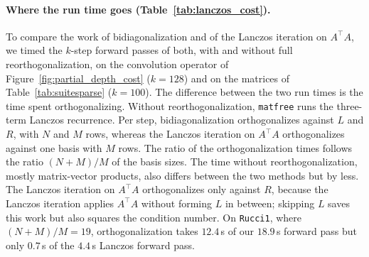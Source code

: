 \documentclass[a4paper,12pt]{article}
\theoremstyle{definition}
\begin{document}
\paragraph{Where the run time goes (Table~\ref{tab:lanczos_cost}).}
To compare the work of bidiagonalization and of the Lanczos iteration on $A^\top A$, we timed the $k$-step forward passes of both, with and without full reorthogonalization, on the convolution operator of Figure~\ref{fig:partial_depth_cost} ($k = 128$) and on the matrices of Table~\ref{tab:suitesparse} ($k = 100$). The difference between the two run times is the time spent orthogonalizing. Without reorthogonalization, \texttt{matfree} runs the three-term Lanczos recurrence. Per step, bidiagonalization orthogonalizes against $L$ and $R$, with $N$ and $M$ rows, whereas the Lanczos iteration on $A^\top A$ orthogonalizes against one basis with $M$ rows. The ratio of the orthogonalization times follows the ratio $(N + M)/M$ of the basis sizes. The time without reorthogonalization, mostly matrix-vector products, also differs between the two methods but by less. The Lanczos iteration on $A^\top A$ orthogonalizes only against $R$, because the Lanczos iteration applies $A^\top A$ without forming $L$ in between; skipping $L$ saves this work but also squares the condition number. On \texttt{Rucci1}, where $(N + M)/M = 19$, orthogonalization takes $12.4$\,s of our $18.9$\,s forward pass but only $0.7$\,s of the $4.4$\,s Lanczos forward pass.

\begin{table}[t]
    \centering
    \small
    \setlength{\tabcolsep}{4pt}
    
    \caption{CPU time in seconds of the $k$-step forward pass of bidiagonalization and of the Lanczos iteration on $A^\top A$, both with full reorthogonalization (``total''), and the part of the total spent orthogonalizing (``orthog.''), measured as the difference to the run time without reorthogonalization. The last column is the ratio of the two orthogonalization times.}
    \label{tab:lanczos_cost}
\end{table}
\end{document}
